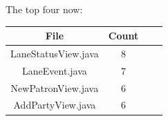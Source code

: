 The top four now:

\begin{tabular}{ |c|c|c|c| }
    \hline
    \textbf{File}       & \textbf{Count} \\
    \hline
    LaneStatusView.java & 8                          \\
    LaneEvent.java           & 7                    \\
    NewPatronView.java       & 6                        \\
    AddPartyView.java   & 6                         \\
    \hline
\end{tabular}
